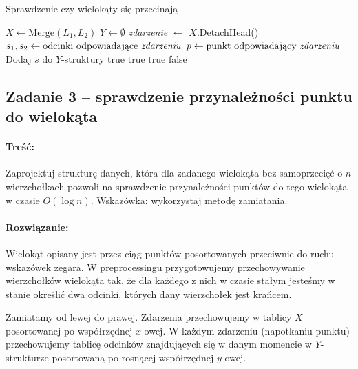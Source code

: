 \begin{algorithm}[H]
	\caption{Sprawdzenie czy wielokąty się przecinają}
	\begin{algorithmic}[1]
		\State $X \gets \text{Merge}(L_1, L_2)$ 
		\State $Y \gets \emptyset$
		\State \textit{zdarzenie} $\gets$ $X.$DetachHead()
		\State $s_1, s_2 \gets \text{odcinki odpowiadające \textit{zdarzeniu}}$
		\State $p \gets \text{punkt odpowiadający \textit{zdarzeniu}}$
		\State Dodaj $s$ do $Y$-struktury
		\State \Return true
		\EndIf
		\State \Return true
		\EndIf
		\Else
		\State \Return true
		\EndIf
		\EndIf
		\EndWhile
		\State \Return false
		\EndProcedure
	\end{algorithmic}
	\label{algZadanie7_1}
\end{algorithm}

\subsection{Zadanie 3 -- sprawdzenie przynależności punktu do wielokąta}
\paragraph{Treść:} Zaprojektuj strukturę danych, która dla zadanego wielokąta bez samoprzecięć o 
$n$ wierzchołkach pozwoli
na sprawdzenie przynależności punktów do tego wielokąta w czasie $O(\log n)$.
Wskazówka: wykorzystaj metodę zamiatania.
\paragraph{Rozwiązanie:} 
Wielokąt opisany jest przez ciąg punktów posortowanych przeciwnie do ruchu wskazówek zegara. W preprocessingu przygotowujemy przechowywanie wierzchołków wielokąta tak, że dla każdego z nich w czasie stałym jesteśmy w stanie określić dwa odcinki, których dany wierzchołek jest krańcem.

Zamiatamy od lewej do prawej. Zdarzenia przechowujemy w tablicy $X$ posortowanej po współrzędnej $x$-owej. W każdym zdarzeniu (napotkaniu punktu) przechowujemy tablicę odcinków znajdujących się w danym momencie w $Y$-strukturze posortowaną po rosnącej współrzędnej $y$-owej. 

